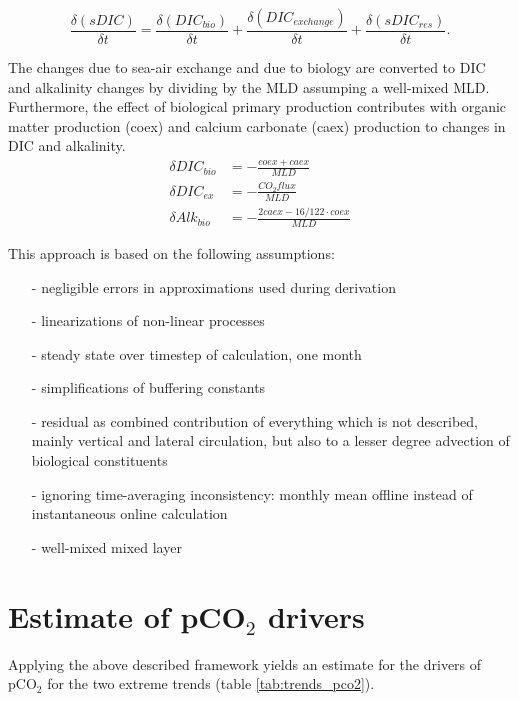 \[\frac{\delta (sDIC)}{\delta t}=\frac{\delta (DIC_{bio})}{\delta t}+\frac{\delta (DIC_{exchange})}{\delta t}+\frac{\delta (sDIC_{res})}{\delta t}.\]

\noindent The changes due to sea-air exchange and due to biology are converted to \acs{DIC} and alkalinity changes by dividing by the \ac{MLD} assumping a well-mixed \acs{MLD}. Furthermore, the effect of biological primary production contributes with organic matter production (coex) and calcium carbonate (caex) production to changes in DIC and alkalinity.
\begin{align*}
\delta DIC_{bio}&=-\frac{coex+caex}{MLD} \\
\delta DIC_{ex}&=-\frac{CO_2flux}{MLD} \\
\delta Alk_{bio}&=-\frac{2caex-16/122 \cdot coex}{MLD}
\end{align*}

\vspace{1cm}

This approach is based on the following assumptions:
\begin{itemize}
\item[-] negligible errors in approximations used during derivation
\item[-] linearizations of non-linear processes
\item[-] steady state over timestep of calculation, \eg one month
\item[-] simplifications of buffering constants \citep{Sarmiento2006}
\item[-] residual as combined contribution of everything which is not described, mainly vertical and lateral circulation, but also to a lesser degree advection of biological constituents
\item[-] ignoring time-averaging inconsistency: monthly mean offline instead of instantaneous online calculation
\item[-] well-mixed mixed layer
\end{itemize}

\clearpage
\section{Estimate of pCO$_2$ drivers}


Applying the above described framework yields an estimate for the drivers of pCO$_2$ for the two extreme trends (table \ref{tab:trends_pco2}).

